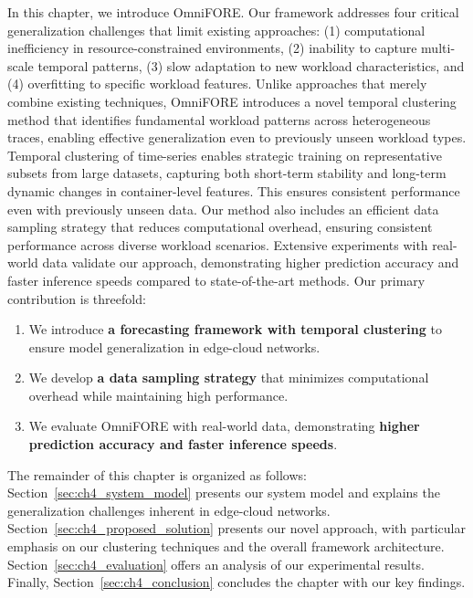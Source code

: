 In this chapter, we introduce \ac{OmniFORE}. Our framework addresses four critical generalization challenges that limit existing approaches: (1) computational inefficiency in resource-constrained environments, (2) inability to capture multi-scale temporal patterns, (3) slow adaptation to new workload characteristics, and (4) overfitting to specific workload features. Unlike approaches that merely combine existing techniques, \ac{OmniFORE} introduces a novel temporal clustering method that identifies fundamental workload patterns across heterogeneous traces, enabling effective generalization even to previously unseen workload types. Temporal clustering of time-series enables strategic training on representative subsets from large datasets, capturing both short-term stability and long-term dynamic changes in container-level features. This ensures consistent performance even with previously unseen data. Our method also includes an efficient data sampling strategy that reduces computational overhead, ensuring consistent performance across diverse workload scenarios. Extensive experiments with real-world data validate our approach, demonstrating higher prediction accuracy and faster inference speeds compared to state-of-the-art methods. Our primary contribution is threefold:

\begin{enumerate}
\item We introduce \textbf{a forecasting framework with temporal clustering} to ensure model generalization in edge-cloud networks.
\item We develop \textbf{a data sampling strategy} that minimizes computational overhead while maintaining high performance.
\item We evaluate \ac{OmniFORE} with real-world data, demonstrating \textbf{higher prediction accuracy and faster inference speeds}.
\end{enumerate}

The remainder of this chapter is organized as follows: Section~\ref{sec:ch4_system_model} presents our system model and explains the generalization challenges inherent in edge-cloud networks. Section~\ref{sec:ch4_proposed_solution} presents our novel approach, with particular emphasis on our clustering techniques and the overall framework architecture. Section~\ref{sec:ch4_evaluation} offers an analysis of our experimental results. Finally, Section~\ref{sec:ch4_conclusion} concludes the chapter with our key findings.

